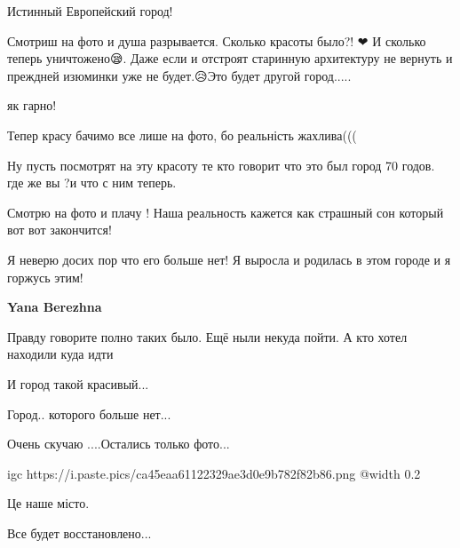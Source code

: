 
Истинный Европейский город!


Смотриш на фото и душа разрывается. Сколько красоты было?! ❤ И сколько теперь
уничтожено😪. Даже если и отстроят старинную архитектуру не вернуть и преждней
изюминки уже не будет.😥Это будет другой город.....


як гарно!


Тепер красу бачимо все лише на фото, бо реальність жахлива(((


Ну пусть посмотрят на эту красоту те кто говорит что это был город 70 годов.
где же вы ?и что с ним теперь.


Смотрю на фото и плачу ! Наша реальность кажется как страшный сон который вот вот закончится!


Я неверю досих пор что его больше нет! Я выросла и родилась в этом городе и я
горжусь этим!

\textbf{Yana Berezhna} 

Правду говорите полно таких было. Ещё ныли некуда пойти. А кто хотел находили куда идти 🚶


И город такой красивый...


Город.. которого больше нет...🥺😭😭😭


Очень скучаю ....Остались только фото...

\ifcmt
  igc https://i.paste.pics/ca45eaa61122329ae3d0e9b782f82b86.png
	@width 0.2
\fi


Це наше місто.


Все будет восстановлено...
